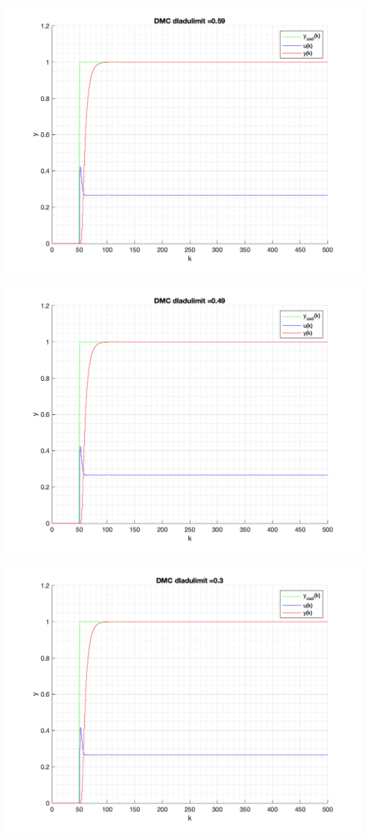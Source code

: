 \documentclass[a4paper, 11pt]{article}
\begin{document}
\begin{enumerate}
 \includegraphics[width=\linewidth]{./ModelsP6_dulimit/P4_DMC_dulimit_0_59_png.png} 
 
 \includegraphics[width=\linewidth]{./ModelsP6_dulimit/P4_DMC_dulimit_0_49_png.png} 
 
 \includegraphics[width=\linewidth]{./ModelsP6_dulimit/P4_DMC_dulimit_0_3_png.png} 
 

\end{enumerate}
\end{document}
